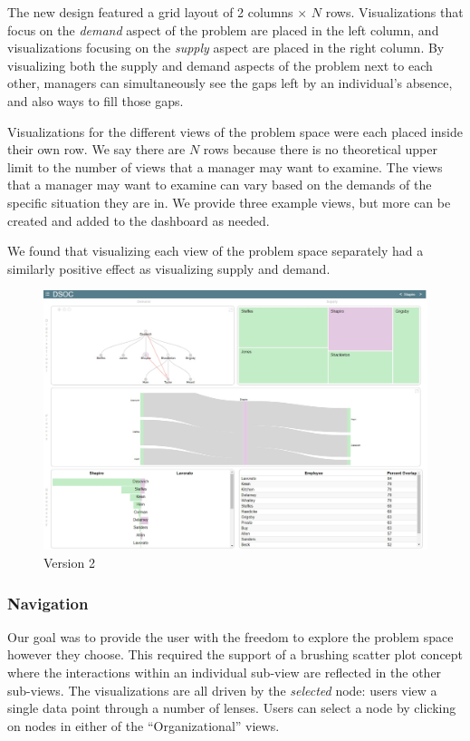 \documentclass[journal]{vgtc}                %
\begin{document}
The new design featured a grid layout of 2 columns $\times $ $N$ rows. Visualizations that focus on the \emph{demand} aspect of the problem are placed in the left column, and visualizations focusing on the \emph{supply} aspect are placed in the right column. By visualizing both the supply and demand aspects of the problem next to each other, managers can simultaneously see the gaps left by an individual's absence, and also ways to fill those gaps.

Visualizations for the different views of the problem space were each placed inside their own row. We say there are $N$ rows because there is no theoretical upper limit to the number of views that a manager may want to examine. The views that a manager may want to examine can vary based on the demands of the specific situation they are in. We provide three example views, but more can be created and added to the dashboard as needed.

We found that visualizing each view of the problem space separately had a similarly positive effect as visualizing supply and demand. 

\begin{figure}
  \centering
  \includegraphics[width=\columnwidth]{pictures/version2.jpg}
  \caption{Version 2}
  \label{fig:version2}
\end{figure}

\subsubsection{Navigation}

Our goal was to provide the user with the freedom to explore the problem space however they choose.  This required the support of a brushing scatter plot concept where the interactions within an individual sub-view are reflected in the other sub-views. The visualizations are all driven by the \emph{selected} node: users view a single data point through a number of lenses. Users can select a node by clicking on nodes in either of the ``Organizational'' views. 
\end{document}
